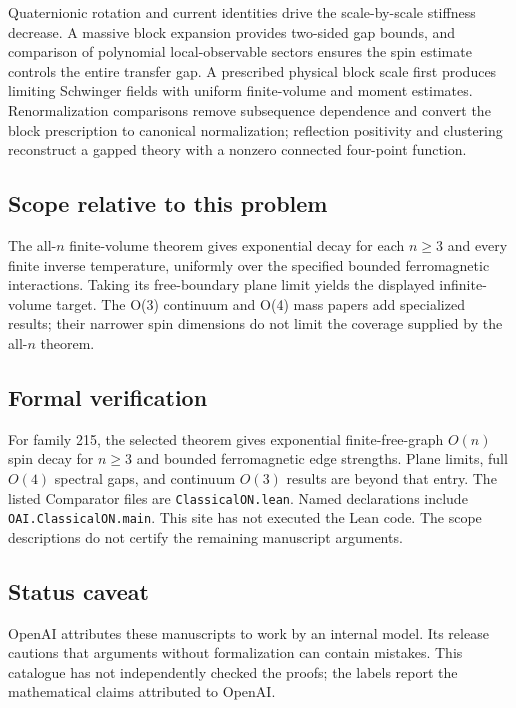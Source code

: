 \documentclass[11pt]{article}
\begin{document}
Quaternionic rotation and current identities drive the scale-by-scale stiffness decrease. A massive block expansion provides two-sided gap bounds, and comparison of polynomial local-observable sectors ensures the spin estimate controls the entire transfer gap. A prescribed physical block scale first produces limiting Schwinger fields with uniform finite-volume and moment estimates. Renormalization comparisons remove subsequence dependence and convert the block prescription to canonical normalization; reflection positivity and clustering reconstruct a gapped theory with a nonzero connected four-point function.

\subsection{Scope relative to this problem}
The all-$n$ finite-volume theorem gives exponential decay for each $n\ge3$ and every finite inverse temperature, uniformly over the specified bounded ferromagnetic interactions. Taking its free-boundary plane limit yields the displayed infinite-volume target. The O(3) continuum and O(4) mass papers add specialized results; their narrower spin dimensions do not limit the coverage supplied by the all-$n$ theorem.

\subsection{Formal verification}
For family 215, the selected theorem gives exponential finite-free-graph $O(n)$ spin decay for $n\geq3$ and bounded ferromagnetic edge strengths. Plane limits, full $O(4)$ spectral gaps, and continuum $O(3)$ results are beyond that entry. The listed Comparator files are \texttt{ClassicalON.lean}. Named declarations include \texttt{OAI.ClassicalON.main}. This site has not executed the Lean code. The scope descriptions do not certify the remaining manuscript arguments.

\subsection{Status caveat}
OpenAI attributes these manuscripts to work by an internal model. Its release cautions that arguments without formalization can contain mistakes. This catalogue has not independently checked the proofs; the labels report the mathematical claims attributed to OpenAI.
\end{document}
